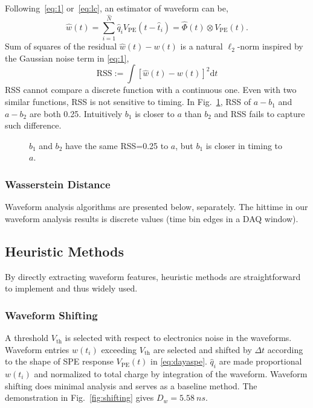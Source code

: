 Following~\eqref{eq:1} or~\eqref{eq:lc}, an estimator of waveform can be,
\begin{equation}
  \label{eq:w-hat}
  \hat{w}(t) = \sum_{i=1}^{\hat{N}}\hat{q}_iV_\mathrm{PE}(t-\hat{t}_i) = \hat{\Phi}(t) \otimes V_\mathrm{PE}(t).
\end{equation}
Sum of squares of the residual $\hat{w}(t) - w(t)$ is a natural $\ell_2$-norm inspired by the Gaussian noise term in \eqref{eq:1},
\begin{equation}
  \label{eq:rss}
  \mathrm{RSS}:=\int\left[\hat{w}(t) - w(t)\right]^2\mathrm{d}t
\end{equation}
RSS cannot compare a discrete function with a continuous one.  Even with two similar functions, RSS is not sensitive to timing.  In Fig.~\ref{fig:l2}, RSS of  $a-b_{1}$ and $a-b_{2}$ are both 0.25.  Intuitively $b_1$ is closer to $a$ than $b_2$ and RSS fails to capture such difference.
\begin{figure}[H]
    \centering
    \scalebox{0.5}{}
    \caption{\label{fig:l2} $b_1$ and $b_2$ have the same RSS=0.25 to $a$, but $b_1$ is closer in timing to $a$.}
\end{figure}

\subsubsection{Wasserstein Distance}
\label{sec:W-dist}



Waveform analysis algorithms are presented below, separately. The hittime in our waveform analysis results is discrete values (time bin edges in a DAQ window). 

\subsection{Heuristic Methods}
By directly extracting waveform features, heuristic methods are straightforward to implement and thus widely used. 

\subsubsection{Waveform Shifting}
\label{sec:shifting}
A threshold $V_\mathrm{th}$ is selected with respect to electronics noise in the waveforms. Waveform entries $w(t_i)$ exceeding $V_\mathrm{th}$ are selected and shifted by $\Delta t$ according to the shape of SPE response $V_\mathrm{PE}(t)$ in \eqref{eq:dayaspe}. $\hat{q}_i$ are made proportional $w(t_i)$ and normalized to total charge by integration of the waveform.  Waveform shifting does minimal analysis and serves as a baseline method.  The demonstration in Fig.~\ref{fig:shifting} gives $D_w = \SI{5.58}{ns}$.

